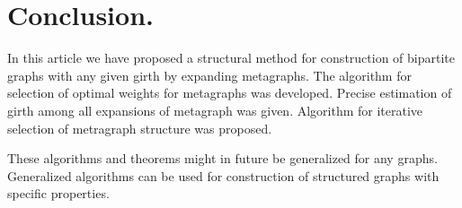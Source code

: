 \documentclass[leqno]{aadmbook}
\begin{document}
\section{Conclusion.}


In this article we have proposed a structural method for construction of bipartite graphs with any given girth by expanding metagraphs. The algorithm for selection of optimal weights for metagraphs was developed. Precise estimation of girth among all expansions of metagraph was given. Algorithm for iterative selection of metragraph structure was proposed.

These algorithms and theorems might in future be generalized for any graphs. Generalized algorithms can be used for construction of structured graphs with specific properties.
\end{document}
